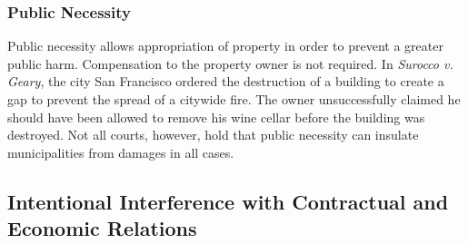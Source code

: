 \subsubsection{Public Necessity}

Public necessity allows appropriation of property in order to prevent a 
greater public harm. Compensation to the property owner is not required. In 
\emph{Surocco v. Geary}, the city San Francisco ordered the destruction of a 
building to create a gap to prevent the spread of a citywide fire. The owner 
unsuccessfully claimed he should have been allowed to remove his wine cellar 
before the building was destroyed. Not all courts, however, hold that public 
necessity can insulate municipalities from damages in all cases.

\subsection{Intentional Interference with Contractual and Economic Relations}


